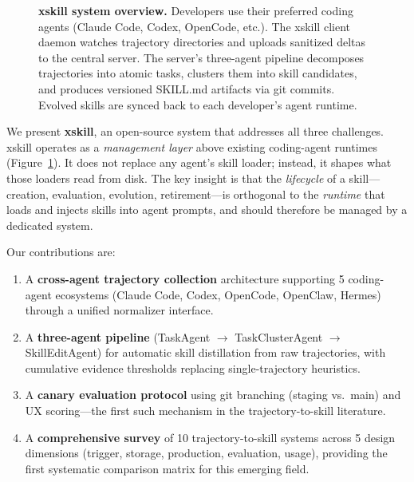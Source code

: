 \documentclass[11pt]{article}
\begin{document}
\begin{figure}[t]
\caption{\textbf{xskill system overview.} Developers use their preferred coding agents (Claude Code, Codex, OpenCode, etc.). The xskill client daemon watches trajectory directories and uploads sanitized deltas to the central server. The server's three-agent pipeline decomposes trajectories into atomic tasks, clusters them into skill candidates, and produces versioned SKILL.md artifacts via git commits. Evolved skills are synced back to each developer's agent runtime.}
\label{fig:overview}
\end{figure}

We present \textbf{xskill}, an open-source system that addresses all three challenges. xskill operates as a \emph{management layer} above existing coding-agent runtimes (Figure~\ref{fig:overview}). It does not replace any agent's skill loader; instead, it shapes what those loaders read from disk. The key insight is that the \emph{lifecycle} of a skill---creation, evaluation, evolution, retirement---is orthogonal to the \emph{runtime} that loads and injects skills into agent prompts, and should therefore be managed by a dedicated system.

Our contributions are:
\begin{enumerate}
    \item A \textbf{cross-agent trajectory collection} architecture supporting 5 coding-agent ecosystems (Claude Code, Codex, OpenCode, OpenClaw, Hermes) through a unified normalizer interface.
    \item A \textbf{three-agent pipeline} (TaskAgent $\to$ TaskClusterAgent $\to$ SkillEditAgent) for automatic skill distillation from raw trajectories, with cumulative evidence thresholds replacing single-trajectory heuristics.
    \item A \textbf{canary evaluation protocol} using git branching (staging vs.\ main) and UX scoring---the first such mechanism in the trajectory-to-skill literature.
    \item A \textbf{comprehensive survey} of 10 trajectory-to-skill systems across 5 design dimensions (trigger, storage, production, evaluation, usage), providing the first systematic comparison matrix for this emerging field.
\end{enumerate}
\end{document}
